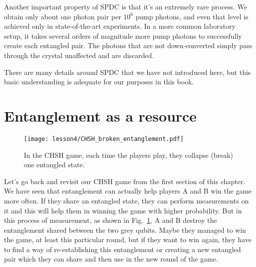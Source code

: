 Another important property of SPDC is that it's an extremely rare process.  We obtain only about one photon pair per $10^6$ pump photons, and even that level is achieved only in state-of-the-art experiments. In a more common laboratory setup, it takes several orders of magnitude more pump photons to successfully create each entangled pair.  The photons that are not down-converted simply pass through the crystal unaffected and are discarded.

There are many details around SPDC that we have not introduced here, but this basic understanding is adequate for our purposes in this book.



\section{Entanglement as a resource}

\begin{figure}[H]
   \centering
    \texttt{[image: lesson4/CHSH\_broken\_entanglement.pdf]}
    
        \caption[CHSH game collapses entanglement.]{In the CHSH game, each time the players play, they collapse (break) one entangled state.}
    
    \label{fig:chsh-broken}
\end{figure}


Let's go back and revisit our CHSH game from the first section of this chapter. We have seen that entanglement can actually help players A and B win the game more often. If they share an entangled state, they can perform measurements on it and this will help them in winning the game with higher probability. But in this process of measurement, as shown in Fig.~\ref{fig:chsh-broken}, A and B destroy the entanglement shared between the two grey qubits.  Maybe they managed to win the game, at least this particular round, but if they want to win again, they have to find a way of re-establishing this entanglement or creating a new entangled pair which they can share and then use in the new round of the game. 

